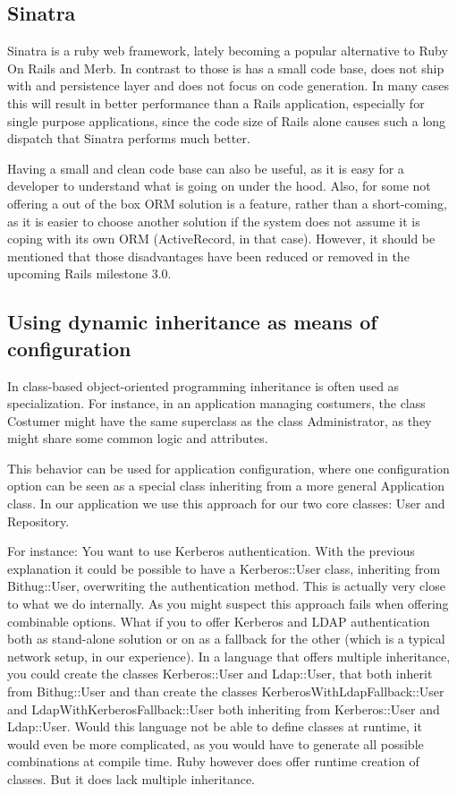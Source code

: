 \documentclass{llncs}
\begin{document}
\subsection{Sinatra}
Sinatra is a ruby web framework\cite{sinatra:www}, lately becoming a popular alternative to Ruby On Rails and Merb.
In contrast to those is has a small code base, does not ship with and persistence layer and does not focus on code
generation. In many cases this will result in better performance than a Rails application, especially for single
purpose applications, since the code size of Rails alone causes such a long dispatch that Sinatra performs much better.

Having a small and clean code base can also be useful, as it is easy for a developer to understand what is going on under the hood.
Also, for some not offering a out of the box ORM solution is a feature, rather than a short-coming, as it is easier to
choose another solution if the system does not assume it is coping with its own ORM (ActiveRecord, in that case). However,
it should be mentioned that those disadvantages have been reduced or removed in the upcoming Rails milestone 3.0.

\subsection{Using dynamic inheritance as means of configuration}
In class-based object-oriented programming inheritance is often used as specialization.
For instance, in an application managing costumers, the class Costumer might have the same
superclass as the class Administrator, as they might share some common logic and attributes.

This behavior can be used for application configuration, where one configuration option can be seen
as a special class inheriting from a more general Application class. In our application we use this
approach for our two core classes: User and Repository.

For instance: You want to use Kerberos authentication. With the previous explanation it could be possible
to have a Kerberos::User class, inheriting from Bithug::User, overwriting the authentication method.
This is actually very close to what we do internally. As you might suspect this approach fails when offering
combinable options. What if you to offer Kerberos and LDAP authentication both as stand-alone solution or
on as a fallback for the other (which is a typical network setup, in our experience). In a language that offers
multiple inheritance, you could create the classes Kerberos::User and Ldap::User, that both inherit from Bithug::User
and than create the classes KerberosWithLdapFallback::User and LdapWithKerberosFallback::User both inheriting
from Kerberos::User and Ldap::User. Would this language not be able to define classes at runtime, it would even be
more complicated, as you would have to generate all possible combinations at compile time. Ruby however does offer
runtime creation of classes. But it does lack multiple inheritance.
\end{document}
